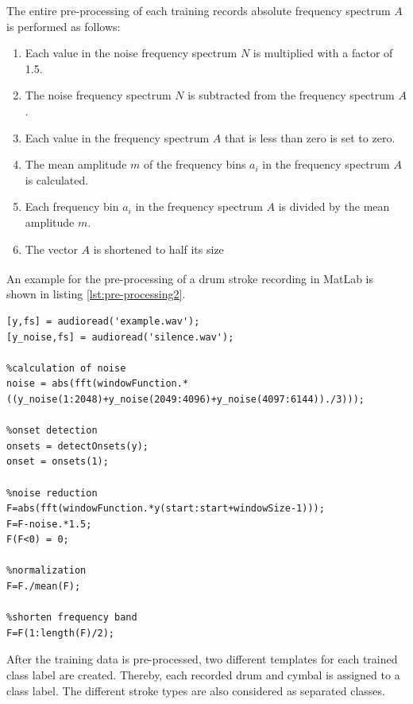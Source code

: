 The entire pre-processing of each training records absolute frequency spectrum $A$ is performed as follows:

\begin{enumerate}
	\item Each value in the noise frequency spectrum $N$ is multiplied with a factor of 1.5.
	\item The noise frequency spectrum $N$ is subtracted from the frequency spectrum $A$.
	\item Each value in the frequency spectrum $A$ that is less than zero is set to zero.
	\item The mean amplitude $m$ of the frequency bins $a_i$ in the frequency spectrum $A$ is calculated.
	\item Each frequency bin $a_i$ in the frequency spectrum $A$ is divided by the mean amplitude $m$.
	\item The vector $A$ is shortened to half its size
\end{enumerate}

An example for the pre-processing of a drum stroke recording in MatLab\textsuperscript{\textregistered} is shown in listing \ref{lst:pre-processing2}.

\begin{lstlisting}[caption={pre-processing of an example drum stroke recording.},label={lst:pre-processing2}]
%read in audio files
[y,fs] = audioread('example.wav');
[y_noise,fs] = audioread('silence.wav');

%calculation of noise
noise = abs(fft(windowFunction.*((y_noise(1:2048)+y_noise(2049:4096)+y_noise(4097:6144))./3)));

%onset detection
onsets = detectOnsets(y);
onset = onsets(1);

%noise reduction
F=abs(fft(windowFunction.*y(start:start+windowSize-1)));
F=F-noise.*1.5;
F(F<0) = 0;

%normalization
F=F./mean(F);

%shorten frequency band
F=F(1:length(F)/2);
\end{lstlisting}


After the training data is pre-processed, two different templates for each trained class label are created. Thereby, each recorded drum and cymbal is assigned to a class label. The different stroke types are also considered as separated classes.

